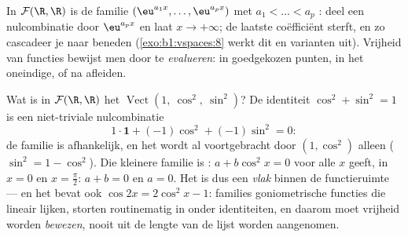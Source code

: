 \begin{example}\label{ex:b1:vspaces:functionfree}
In $\mathcal{F}(\R,\R)$ is de familie $(\eu^{a_1 x}, \dots,
\eu^{a_p x})$ met $a_1 < \dots < a_p$ : deel een nulcombinatie
door $\eu^{a_p x}$ en laat $x \to +\infty$; de laatste coëfficiënt
sterft, en zo cascadeer je naar beneden (\cref{exo:b1:vspaces:8}
werkt dit en varianten uit). Vrijheid van functies bewijst men door
te \emph{evalueren}: in goedgekozen punten, in het oneindige, of na
afleiden.
\end{example}

\begin{example}
\label{ex:b1:vspaces:hiddenrelation}
Wat is in $\mathcal{F}(\R, \R)$ het 
$\operatorname{Vect}(1,\ \cos^2,\ \sin^2)$? De identiteit $\cos^2
+ \sin^2 = 1$ is een niet-triviale nulcombinatie
\[
1\cdot\mathbf{1} + (-1)\cos^2 + (-1)\sin^2 = 0 :
\]
de familie is afhankelijk, en het  wordt al voortgebracht
door $(1, \cos^2)$ alleen ($\sin^2 = 1 - \cos^2$). Die kleinere
familie is : $a + b\cos^2 x = 0$ voor alle $x$ geeft, in $x =
0$ en $x = \frac\pi2$: $a + b = 0$ en $a = 0$. Het  is
dus een \emph{vlak} binnen de functieruimte --- en het bevat ook
$\cos 2x = 2\cos^2 x - 1$: families goniometrische functies die
lineair lijken, storten routinematig in onder identiteiten, en
daarom moet vrijheid worden \emph{bewezen}, nooit uit de lengte
van de lijst worden aangenomen.
\end{example}

